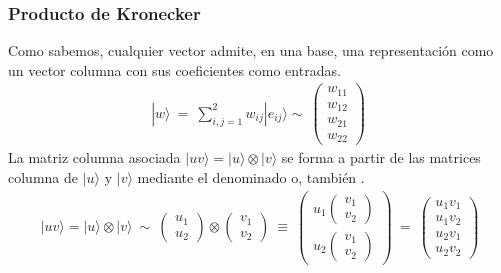\documentclass[letterpaper,10pt,english]{jupyterBook}
\newcommand{\ket}[1]{|#1\rangle}
\begin{document}
\subsubsection{Producto de Kronecker}
\label{\detokenize{docs/Part_01_Formalismo/Chapter_01_02_Formalismo_matem_xe1tico/01_04_Tensores_myst:producto-de-kronecker}}
\sphinxAtStartPar
Como sabemos, cualquier vector admite, en una base, una representación como un vector columna con sus coeficientes como entradas.
\begin{equation*}
\begin{split}
\ket{w} ~= ~ \sum_{i,j=1}^2 w_{ij} \ket{e_{ij}}\sim~ \begin{pmatrix}w_{11}\\ w_{12}\\ w_{21} \\ w_{22}  \end{pmatrix}  ~  
\end{split}
\end{equation*}
\sphinxAtStartPar
La matriz columna asociada \(\ket{uv}= \ket{u}\otimes \ket{v}\) se forma a partir de las matrices columna de \(\ket{u}\) y \(\ket{v}\) mediante el denominado  o, también .
\begin{equation*}
\begin{split}
 \ket{uv} = \ket{u}\otimes \ket{v} ~\sim~ 
\begin{pmatrix}u_1\\ u_2 \end{pmatrix}\otimes \begin{pmatrix}v_1\\ v_2 \end{pmatrix} ~\equiv ~
\begin{pmatrix}u_1 \begin{pmatrix}v_1\\ v_2 \end{pmatrix} \\ u_2 \begin{pmatrix}v_1\\ v_2 \end{pmatrix}  \end{pmatrix}
~=~\begin{pmatrix}u_1v_1\\ u_1v_2 \\ u_2 v_1 \\ u_2 v_2  \end{pmatrix}
\end{split}
\end{equation*}
\end{document}

